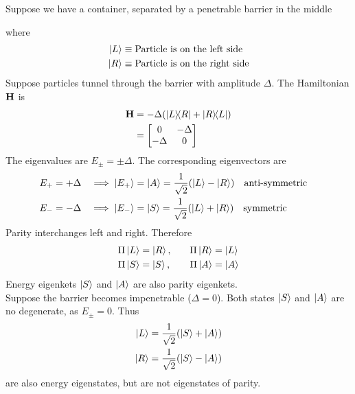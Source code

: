 \documentclass[12pt,a4paper,titlepage]{article}
\newcommand{\trm}[1]{\textrm{#1}} %
\begin{document}
Suppose we have a container, separated by a penetrable barrier in the middle
\begin{center}
\end{center}
where
\begin{equation}
\begin{aligned}
\ket{L}&\equiv\trm{Particle is on the left side}\\
\ket{R}&\equiv\trm{Particle is on the right side}
\end{aligned}
\end{equation}
Suppose particles tunnel through the barrier with amplitude $\Delta$. The Hamiltonian $\vb{H}$ is
\begin{equation}
\begin{aligned}
\vb{H}&=-\Delta\qty(\op{L}{R}+\op{R}{L})\\
&=\mqty[0 & -\Delta \\ -\Delta & 0]
\end{aligned}
\end{equation}
The eigenvalues are $E_{\pm}=\pm\Delta$. The corresponding eigenvectors are
\begin{equation}
\begin{aligned}
E_{+}&=+\Delta &\implies \ket{E_{+}}&=\ket{A}=\frac{1}{\sqrt{2}}(\ket{L}-\ket{R})\qq{anti-symmetric}\\
E_{-}&=-\Delta &\implies \ket{E_{-}}&=\ket{S}=\frac{1}{\sqrt{2}}(\ket{L}+\ket{R})\qq{symmetric}
\end{aligned}
\end{equation}
Parity interchanges left and right. Therefore
\begin{equation}
\begin{aligned}
\Pi\ket{L}&=\ket{R},\quad&\Pi\ket{R}&=\ket{L}\\
\Pi\ket{S}&=\ket{S},\quad&\Pi\ket{A}&=\ket{A}
\end{aligned}
\end{equation}
Energy eigenkets $\ket{S}$ and $\ket{A}$ are also parity eigenkets.\\

Suppose the barrier becomes impenetrable ($\Delta=0$). Both states $\ket{S}$ and $\ket{A}$ are no degenerate, as $E_{\pm}=0$. Thus
\begin{equation}
\begin{aligned}
\ket{L}&=\frac{1}{\sqrt{2}}(\ket{S}+\ket{A})\\
\ket{R}&=\frac{1}{\sqrt{2}}(\ket{S}-\ket{A})
\end{aligned}
\end{equation}
are also energy eigenstates, but are not eigenstates of parity.\\
\end{document}
